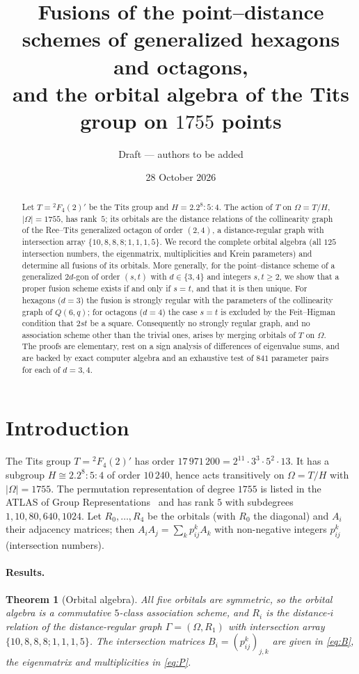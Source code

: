 \documentclass[11pt]{article}
\title{Fusions of the point--distance schemes of generalized hexagons and octagons,\\
and the orbital algebra of the Tits group on $1755$ points}
\author{Draft --- authors to be added}
\date{28 October 2026}
\newtheorem{theorem}{Theorem}
\theoremstyle{remark}
\begin{document}
\maketitle

\begin{abstract}
Let $T={}^2F_4(2)'$ be the Tits group and $H=2.2^{8}{:}5{:}4$. The action of $T$ on $\Omega=T/H$, $|\Omega|=1755$, has rank~$5$; its orbitals are the distance relations of the collinearity graph of the Ree--Tits generalized octagon of order $(2,4)$, a distance-regular graph with intersection array $\{10,8,8,8;1,1,1,5\}$. We record the complete orbital algebra (all $125$ intersection numbers, the eigenmatrix, multiplicities and Krein parameters) and determine all fusions of its orbitals. More generally, for the point--distance scheme of a generalized $2d$-gon of order $(s,t)$ with $d\in\{3,4\}$ and integers $s,t\ge 2$, we show that a proper fusion scheme exists if and only if $s=t$, and that it is then unique. For hexagons ($d=3$) the fusion is strongly regular with the parameters of the collinearity graph of $Q(6,q)$; for octagons ($d=4$) the case $s=t$ is excluded by the Feit--Higman condition that $2st$ be a square. Consequently no strongly regular graph, and no association scheme other than the trivial ones, arises by merging orbitals of $T$ on $\Omega$. The proofs are elementary, rest on a sign analysis of differences of eigenvalue sums, and are backed by exact computer algebra and an exhaustive test of $841$ parameter pairs for each of $d=3,4$.
\end{abstract}

\section{Introduction}

The Tits group $T={}^2F_4(2)'$ has order $17\,971\,200=2^{11}\cdot3^3\cdot5^2\cdot13$. It has a subgroup $H\cong 2.2^8{:}5{:}4$ of order $10\,240$, hence acts transitively on $\Omega=T/H$ with $|\Omega|=1755$. The permutation representation of degree $1755$ is listed in the ATLAS of Group Representations~\cite{ATLASrep} and has rank $5$ with subdegrees $1,10,80,640,1024$. Let $R_0,\dots,R_4$ be the orbitals (with $R_0$ the diagonal) and $A_i$ their adjacency matrices; then $A_iA_j=\sum_{k}p_{ij}^kA_k$ with non-negative integers $p_{ij}^k$ (intersection numbers).

\paragraph{Results.}
\begin{theorem}[Orbital algebra]\label{thm:A}
All five orbitals are symmetric, so the orbital algebra is a commutative $5$-class association scheme, and $R_i$ is the distance-$i$ relation of the distance-regular graph $\Gamma=(\Omega,R_1)$ with intersection array $\{10,8,8,8;1,1,1,5\}$. The intersection matrices $B_i=(p_{ij}^k)_{j,k}$ are given in \eqref{eq:B}, the eigenmatrix and multiplicities in \eqref{eq:P}.
\end{theorem}
\end{document}

